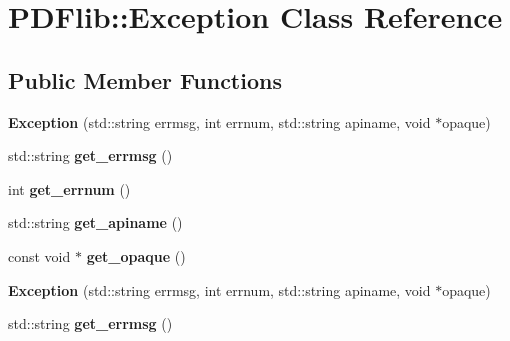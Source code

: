 \hypertarget{classPDFlib_1_1Exception}{\section{\-P\-D\-Flib\-:\-:\-Exception \-Class \-Reference}
\label{classPDFlib_1_1Exception}
}
\subsection*{\-Public \-Member \-Functions}
\begin{DoxyCompactItemize}
\item 
\hypertarget{classPDFlib_1_1Exception_a57fa9533e1498e00612ac13349c78ac8}{{\bfseries \-Exception} (std\-::string errmsg, int errnum, std\-::string apiname, void $\ast$opaque)}\label{classPDFlib_1_1Exception_a57fa9533e1498e00612ac13349c78ac8}

\item 
\hypertarget{classPDFlib_1_1Exception_a0a197e182bf824c5654f721bf18debbf}{std\-::string {\bfseries get\-\_\-errmsg} ()}\label{classPDFlib_1_1Exception_a0a197e182bf824c5654f721bf18debbf}

\item 
\hypertarget{classPDFlib_1_1Exception_aa29ae977a69d26d5a6aea1da399ff599}{int {\bfseries get\-\_\-errnum} ()}\label{classPDFlib_1_1Exception_aa29ae977a69d26d5a6aea1da399ff599}

\item 
\hypertarget{classPDFlib_1_1Exception_a1463d47b0cb8d9f2251ffcbede9f6310}{std\-::string {\bfseries get\-\_\-apiname} ()}\label{classPDFlib_1_1Exception_a1463d47b0cb8d9f2251ffcbede9f6310}

\item 
\hypertarget{classPDFlib_1_1Exception_a6a286472fd0e02d9a02d24c2d83478f1}{const void $\ast$ {\bfseries get\-\_\-opaque} ()}\label{classPDFlib_1_1Exception_a6a286472fd0e02d9a02d24c2d83478f1}

\item 
\hypertarget{classPDFlib_1_1Exception_a57fa9533e1498e00612ac13349c78ac8}{{\bfseries \-Exception} (std\-::string errmsg, int errnum, std\-::string apiname, void $\ast$opaque)}\label{classPDFlib_1_1Exception_a57fa9533e1498e00612ac13349c78ac8}

\item 
\hypertarget{classPDFlib_1_1Exception_a175d42d1c094da0503f7cfcb1219c49f}{std\-::string {\bfseries get\-\_\-errmsg} ()}\label{classPDFlib_1_1Exception_a175d42d1c094da0503f7cfcb1219c49f}


\end{DoxyCompactItemize}

